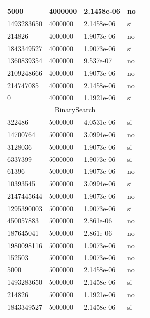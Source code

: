 \documentclass[12pt, fleqn]{article}                             %
\theoremstyle{break}                                            %
\begin{document}
\begin{longtable}{|m{5em}|m{5em}|m{10em}|m{5em}|@{}m{0pt}@{}}
            5000& 4000000  & 2.1458e-06 & no &\\[1em]    \hline
            1493283650& 4000000  & 2.1458e-06 & si &\\[1em]    \hline
            214826& 4000000  & 1.9073e-06 & no &\\[1em]    \hline
            1843349527& 4000000  & 1.9073e-06 & si &\\[1em]    \hline
            1360839354& 4000000  & 9.537e-07 & no &\\[1em]    \hline
            2109248666& 4000000  & 1.9073e-06 & no &\\[1em]    \hline
            214747085& 4000000  & 2.1458e-06 & no &\\[1em]    \hline
            0& 4000000  & 1.1921e-06 & si &\\[1em]    \hline
            \multicolumn{5}{|c|}{BinarySearch}   \\          \hline
            322486& 5000000  & 4.0531e-06 & si &\\[1em]    \hline
            14700764& 5000000  & 3.0994e-06 & no &\\[1em]    \hline
            3128036& 5000000  & 1.9073e-06 & si &\\[1em]    \hline
            6337399& 5000000  & 1.9073e-06 & si &\\[1em]    \hline
            61396& 5000000  & 1.9073e-06 & no &\\[1em]    \hline
            10393545& 5000000  & 3.0994e-06 & si &\\[1em]    \hline
            2147445644& 5000000  & 1.9073e-06 & no &\\[1em]    \hline
            1295390003& 5000000  & 1.9073e-06 & si &\\[1em]    \hline
            450057883& 5000000  & 2.861e-06 & no &\\[1em]    \hline
            187645041& 5000000  & 2.861e-06 & no &\\[1em]    \hline
            1980098116& 5000000  & 1.9073e-06 & no &\\[1em]    \hline
            152503& 5000000  & 1.9073e-06 & no &\\[1em]    \hline
            5000& 5000000  & 2.1458e-06 & no &\\[1em]    \hline
            1493283650& 5000000  & 2.1458e-06 & si &\\[1em]    \hline
            214826& 5000000  & 1.1921e-06 & no &\\[1em]    \hline
            1843349527& 5000000  & 2.1458e-06 & si &\\[1em]    \hline

\end{longtable}
\end{document}
